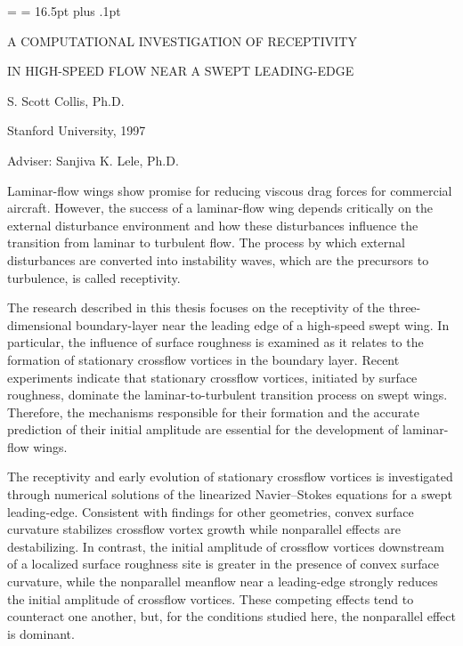 %
%
%
%
%
%
\magnification=
\baselineskip= 16.5pt plus .1pt

\centerline{\uppercase{A Computational Investigation of Receptivity}}
\centerline{\uppercase{in High-Speed Flow Near a Swept Leading-Edge}}
\bigskip
\centerline{ S. Scott Collis, Ph.D.}
\centerline{Stanford University, 1997}
\bigskip
\centerline{ Adviser: Sanjiva K. Lele, Ph.D.}
\bigskip

Laminar-flow wings show promise for reducing viscous drag forces for
commercial aircraft.  However, the success of a laminar-flow wing depends
critically on the external disturbance environment and how these disturbances
influence the transition from laminar to turbulent flow.  The process by which
external disturbances are converted into instability waves, which are the
precursors to turbulence, is called receptivity.

The research described in this thesis focuses on the receptivity of the
three-dimensional boundary-layer near the leading edge of a high-speed swept
wing.  In particular, the influence of surface roughness is examined as it
relates to the formation of stationary crossflow vortices in the boundary
layer.  Recent experiments indicate that stationary crossflow vortices,
initiated by surface roughness, dominate the laminar-to-turbulent transition
process on swept wings.  Therefore, the mechanisms responsible for their
formation and the accurate prediction of their initial amplitude are essential
for the development of laminar-flow wings.

The receptivity and early evolution of stationary crossflow vortices is
investigated through numerical solutions of the linearized Navier--Stokes
equations for a swept leading-edge.  Consistent with findings for other
geometries, convex surface curvature stabilizes crossflow vortex growth while
nonparallel effects are destabilizing.  In contrast, the initial amplitude of
crossflow vortices downstream of a localized surface roughness site is greater
in the presence of convex surface curvature, while the nonparallel meanflow
near a leading-edge strongly reduces the initial amplitude of crossflow
vortices.  These competing effects tend to counteract one another, but, for
the conditions studied here, the nonparallel effect is dominant.

